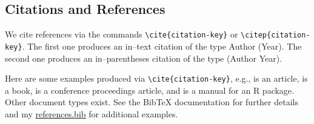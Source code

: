 \documentclass[12pt]{article}
\begin{document}
%
%
%
%
%
%
%


\subsection{Citations and References}

We cite references via the commands \verb|\cite{citation-key}|
or \verb|\citep{citation-key}|. The first one produces
an in--text citation of the type Author (Year). The second one
produces an in--parentheses citation of the type (Author Year).

Here are some examples produced via \verb|\cite{citation-key}|,
e.g., \cite{Sym2011} is an article,
\cite{RS2006} is a book, \cite{SEGVW2004ASA} is
a conference proceedings article, and
\cite{CW2011} is a manual for an R package.
Other document types exist. See the BibTeX documentation
for further details
and my \url{references.bib} for additional examples.
\end{document}
